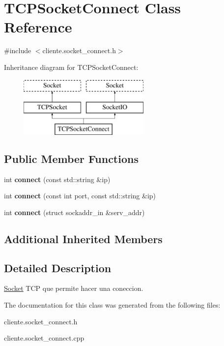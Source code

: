 \hypertarget{classTCPSocketConnect}{\section{T\-C\-P\-Socket\-Connect Class Reference}
\label{classTCPSocketConnect}
}


{\ttfamily \#include $<$cliente.\-socket\-\_\-connect.\-h$>$}

Inheritance diagram for T\-C\-P\-Socket\-Connect\-:\begin{figure}[H]
\begin{center}
\leavevmode
\includegraphics[height=3.000000cm]{classTCPSocketConnect}
\end{center}
\end{figure}
\subsection*{Public Member Functions}
\begin{DoxyCompactItemize}
\item 
\hypertarget{classTCPSocketConnect_a592be26bf68b59f04a91217b87b62b9c}{int {\bfseries connect} (const std\-::string \&ip)}\label{classTCPSocketConnect_a592be26bf68b59f04a91217b87b62b9c}

\item 
\hypertarget{classTCPSocketConnect_aa8bd820d4b7924dd2f556e8fb79c6ddd}{int {\bfseries connect} (const int port, const std\-::string \&ip)}\label{classTCPSocketConnect_aa8bd820d4b7924dd2f556e8fb79c6ddd}

\item 
\hypertarget{classTCPSocketConnect_ad2c5596b70e1278d0a5835b410d3e6f1}{int {\bfseries connect} (struct sockaddr\-\_\-in \&serv\-\_\-addr)}\label{classTCPSocketConnect_ad2c5596b70e1278d0a5835b410d3e6f1}

\end{DoxyCompactItemize}
\subsection*{Additional Inherited Members}


\subsection{Detailed Description}
\hyperlink{classSocket}{Socket} T\-C\-P que permite hacer una coneccion. 

The documentation for this class was generated from the following files\-:\begin{DoxyCompactItemize}
\item 
cliente.\-socket\-\_\-connect.\-h\item 
cliente.\-socket\-\_\-connect.\-cpp\end{DoxyCompactItemize}
